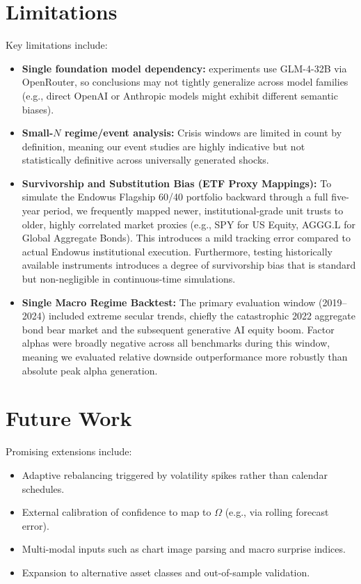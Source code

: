 \documentclass[12pt]{report}
\begin{document}
\section{Limitations}
Key limitations include:
\begin{itemize}
    \item \textbf{Single foundation model dependency:} experiments use GLM-4-32B via OpenRouter, so conclusions may not tightly generalize across model families (e.g., direct OpenAI or Anthropic models might exhibit different semantic biases).
    \item \textbf{Small-$N$ regime/event analysis:} Crisis windows are limited in count by definition, meaning our event studies are highly indicative but not statistically definitive across universally generated shocks.
    \item \textbf{Survivorship and Substitution Bias (ETF Proxy Mappings):} To simulate the Endowus Flagship 60/40 portfolio backward through a full five-year period, we frequently mapped newer, institutional-grade unit trusts to older, highly correlated market proxies (e.g., SPY for US Equity, AGGG.L for Global Aggregate Bonds). This introduces a mild tracking error compared to actual Endowus institutional execution. Furthermore, testing historically available instruments introduces a degree of survivorship bias that is standard but non-negligible in continuous-time simulations.
    \item \textbf{Single Macro Regime Backtest:} The primary evaluation window (2019--2024) included extreme secular trends, chiefly the catastrophic 2022 aggregate bond bear market and the subsequent generative AI equity boom. Factor alphas were broadly negative across all benchmarks during this window, meaning we evaluated relative downside outperformance more robustly than absolute peak alpha generation.
\end{itemize}

\section{Future Work}
Promising extensions include:
\begin{itemize}
    \item Adaptive rebalancing triggered by volatility spikes rather than calendar schedules.
    \item External calibration of confidence to map to $\Omega$ (e.g., via rolling forecast error).
    \item Multi-modal inputs such as chart image parsing and macro surprise indices.
    \item Expansion to alternative asset classes and out-of-sample validation.
\end{itemize}
\end{document}
